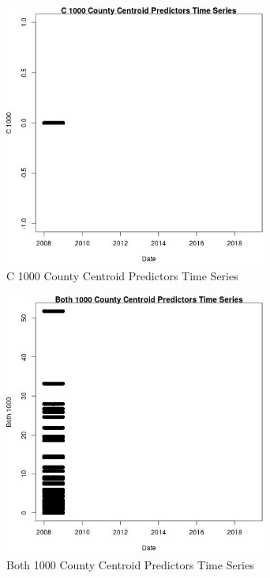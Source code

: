 \begin{figure} 
\centering  
\includegraphics[width=0.77\textwidth]{Code_Outputs/df_report_ML_predictors_CountyCentroid_Locations_Dates_2008-01-01to2018-12-31_C_1000vDate.jpg} 
\caption{\label{fig:df_report_ML_predictors_CountyCentroid_Locations_Dates_2008-01-01to2018-12-31C_1000vDate}C 1000 County Centroid Predictors Time Series} 
\end{figure} 
 

\begin{figure} 
\centering  
\includegraphics[width=0.77\textwidth]{Code_Outputs/df_report_ML_predictors_CountyCentroid_Locations_Dates_2008-01-01to2018-12-31_Both_1000vDate.jpg} 
\caption{\label{fig:df_report_ML_predictors_CountyCentroid_Locations_Dates_2008-01-01to2018-12-31Both_1000vDate}Both 1000 County Centroid Predictors Time Series} 
\end{figure} 
 
